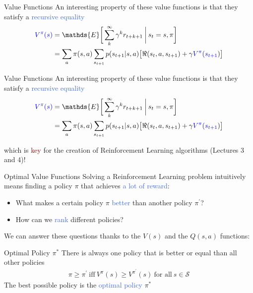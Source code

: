 \documentclass{beamer}
\begin{document}
\begin{frame}{Value Functions}
	An interesting property of these value functions is that they satisfy a \textcolor{RoyalBlue}{recursive equality}
		\begin{align*}
			\textcolor{blue}{V^{\pi}(s)} & = \mathds{E} \bigg[\sum_{k}^{\infty}\gamma^{k} r_{t+k+1} \: \bigg| \: s_t=s,\pi \bigg] \\
			   & = \sum_a \pi(s,a) \sum_{s_{t+1}} p(s_{t+1}|s,a)\big[\Re(s_t, a, s_{t+1}) + \gamma \textcolor{blue}{V^{\pi}(s_{t+1}}) \big] 
		\end{align*}
\end{frame}


\begin{frame}{Value Functions}
	An interesting property of these value functions is that they satisfy a \textcolor{RoyalBlue}{recursive equality}
		\begin{align*}
		\textcolor{blue}{V^{\pi}(s)} & = \mathds{E} \bigg[\sum_{k}^{\infty}\gamma^{k} r_{t+k+1} \: \bigg| \: s_t=s,\pi \bigg] \\
			   & = \sum_a \pi(s,a) \sum_{s_{t+1}} p(s_{t+1}|s,a)\big[\Re(s_t, a, s_{t+1}) + \gamma \textcolor{blue}{V^{\pi}(s_{t+1}}) \big] 
		\end{align*}

	which is \textcolor{Maroon}{key} for the creation of Reinforcement Learning algorithms (Lectures 3 and 4)!
\end{frame}


\begin{frame}{Optimal Value Functions}
	Solving a Reinforcement Learning problem intuitively means finding a policy $\pi$ that achieves \textcolor{RoyalBlue}{a lot of reward}:
	\begin{itemize}
		\item What makes a certain policy $\pi$ \textcolor{RoyalBlue}{better} than another policy $\pi^{'}$? 
		\item How can we \textcolor{RoyalBlue}{rank} different policies?
	\end{itemize}
	
	We can answer these questions thanks to the $V(s)$ and the $Q(s,a)$ functions:

	\begin{block}{Optimal Policy $\pi^*$}
		There is always one policy that is better or equal than all other policies
	\begin{align*}
		\pi \geq \pi^{'}\: \text{iff}\: V^{\pi}(s) \geq V^{\pi^{'}}(s) \: \text{for all}\: s\in\mathcal{S}
	\end{align*}
		The best possible policy is the \textcolor{RoyalBlue}{optimal policy} $\pi^{*}$
	\end{block}
\end{frame}
\end{document}
